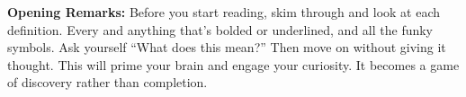 \begin{greenbox}
    \textbf{Opening Remarks:} Before you start reading, skim through and look at each definition.
    Every and anything that's bolded or underlined, and all the funky symbols. Ask yourself
    ``What does this mean?'' Then move on without giving it thought. This will prime your brain
    and engage your curiosity. It becomes a game of discovery rather than completion.
\end{greenbox}